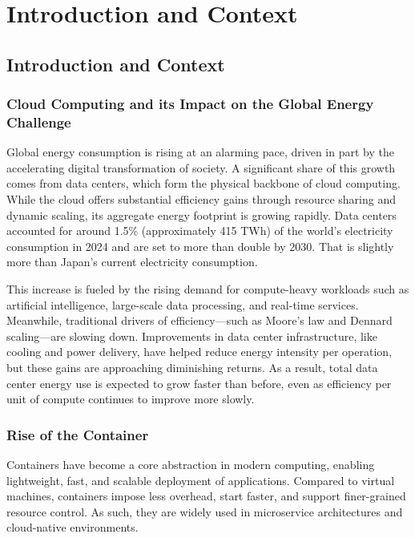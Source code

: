 \chapter{Introduction and Context} %
\label{Chapter1}

\section{Introduction and Context}

\subsection{Cloud Computing and its Impact on the Global Energy Challenge}

Global energy consumption is rising at an alarming pace, driven in part by the accelerating digital transformation of society. A significant share of this growth comes from data centers, which form the physical backbone of cloud computing. While the cloud offers substantial efficiency gains through resource sharing and dynamic scaling, its aggregate energy footprint is growing rapidly. Data centers accounted for around 1.5\% (approximately 415 TWh) of the world's electricity consumption in 2024 and are set to more than double by 2030\parencite{iea2025energyai}. That is slightly more than Japan's current electricity consumption.

This increase is fueled by the rising demand for compute-heavy workloads such as artificial intelligence, large-scale data processing, and real-time services. Meanwhile, traditional drivers of efficiency—such as Moore’s law and Dennard scaling—are slowing down\parencite{tomshardware2023mooreslaw, cartesian2013dennard}. Improvements in data center infrastructure, like cooling and power delivery, have helped reduce energy intensity per operation\parencite{uptime2023pue}, but these gains are approaching diminishing returns. As a result, total data center energy use is expected to grow faster than before, even as efficiency per unit of compute continues to improve more slowly\parencite{masanet2020}.

\subsection{Rise of the Container}

Containers have become a core abstraction in modern computing, enabling lightweight, fast, and scalable deployment of applications. Compared to virtual machines, containers impose less overhead, start faster, and support finer-grained resource control. As such, they are widely used in microservice architectures and cloud-native environments\parencite{Potdar2020}.

